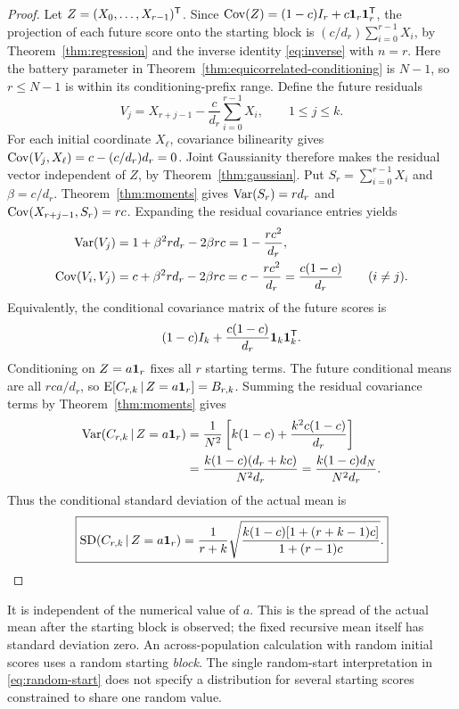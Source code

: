 \begin{proof}
Let \(Z=(X_0,\ldots,X_{r-1})^{\mathsf{T}}\). Since
\(\operatorname{Cov}(Z)=(1-c)I_r+c\mathbf{1}_r\mathbf{1}_r^{\mathsf{T}}\), the projection of each future
score onto the starting block is \((c/d_r)\sum_{i=0}^{r-1}X_i\), by
Theorem~\ref{thm:regression} and the inverse identity
\eqref{eq:inverse} with \(n=r\). Here the battery parameter in
Theorem~\ref{thm:equicorrelated-conditioning} is \(N-1\), so
\(r\leq N-1\) is within its conditioning-prefix range.
Define the future residuals
\[
  V_j=X_{r+j-1}-\frac{c}{d_r}\sum_{i=0}^{r-1}X_i,
  \qquad 1\leq j\leq k.
\]
For each initial coordinate \(X_\ell\), covariance bilinearity gives
\(\operatorname{Cov}(V_j,X_\ell)=c-(c/d_r)d_r=0\). Joint Gaussianity therefore makes
the residual vector independent of \(Z\), by Theorem~\ref{thm:gaussian}.
Put \(S_r=\sum_{i=0}^{r-1}X_i\) and \(\beta=c/d_r\).
Theorem~\ref{thm:moments} gives \(\operatorname{Var}(S_r)=r d_r\) and
\(\operatorname{Cov}(X_{r+j-1},S_r)=rc\). Expanding the residual covariance entries yields
\begin{align*}
  \operatorname{Var}(V_j)&=1+\beta^2r d_r-2\beta rc
      =1-\frac{rc^2}{d_r},\\
  \operatorname{Cov}(V_i,V_j)&=c+\beta^2r d_r-2\beta rc
      =c-\frac{rc^2}{d_r}
      =\frac{c(1-c)}{d_r}\qquad(i\ne j).
\end{align*}
Equivalently, the conditional covariance matrix of the future scores is
\[
  (1-c)I_k+\frac{c(1-c)}{d_r}\mathbf{1}_k\mathbf{1}_k^{\mathsf{T}}.
\]
Conditioning on \(Z=a\mathbf{1}_r\) fixes all \(r\) starting terms. The future
conditional means are all \(rca/d_r\), so
\(\operatorname{E}[C_{r,k}\,\vert\, Z=a\mathbf{1}_r]=B_{r,k}\). Summing the residual covariance
terms by Theorem~\ref{thm:moments} gives
\begin{align}
  \operatorname{Var}(C_{r,k}\,\vert\, Z=a\mathbf{1}_r)
  &=\frac1{N^2}\left[k(1-c)+\frac{k^2c(1-c)}{d_r}\right]\notag\\
  &=\frac{k(1-c)(d_r+kc)}{N^2d_r}
   =\frac{k(1-c)d_N}{N^2d_r}.
   \label{eq:multiple-conditional-variance}
\end{align}
Thus the conditional standard deviation of the actual mean is
\begin{equation}
  \boxed{\operatorname{SD}(C_{r,k}\,\vert\, Z=a\mathbf{1}_r)
    =\frac1{r+k}
      \sqrt{\frac{k(1-c)[1+(r+k-1)c]}{1+(r-1)c}}.}
  \label{eq:multiple-conditional-sd}
\end{equation}
\end{proof}
It is independent of the numerical value of \(a\). This is the spread of
the actual mean after the starting block is observed; the fixed recursive
mean itself has standard deviation zero. An across-population calculation
with random initial scores uses a random starting \emph{block}. The single
random-start interpretation in \eqref{eq:random-start} does not specify a
distribution for several starting scores constrained to share one random value.


